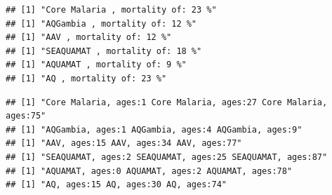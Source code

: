 \documentclass[]{article}
\newenvironment{Shaded}{\begin{snugshade}}{\end{snugshade}}
\newcommand{\KeywordTok}[1]{\textcolor[rgb]{0.13,0.29,0.53}{\textbf{#1}}}
\newcommand{\DataTypeTok}[1]{\textcolor[rgb]{0.13,0.29,0.53}{#1}}
\newcommand{\DecValTok}[1]{\textcolor[rgb]{0.00,0.00,0.81}{#1}}
\newcommand{\StringTok}[1]{\textcolor[rgb]{0.31,0.60,0.02}{#1}}
\newcommand{\ControlFlowTok}[1]{\textcolor[rgb]{0.13,0.29,0.53}{\textbf{#1}}}
\newcommand{\OperatorTok}[1]{\textcolor[rgb]{0.81,0.36,0.00}{\textbf{#1}}}
\newcommand{\NormalTok}[1]{#1}
\begin{document}
\begin{verbatim}
## [1] "Core Malaria , mortality of: 23 %"
## [1] "AQGambia , mortality of: 12 %"
## [1] "AAV , mortality of: 12 %"
## [1] "SEAQUAMAT , mortality of: 18 %"
## [1] "AQUAMAT , mortality of: 9 %"
## [1] "AQ , mortality of: 23 %"
\end{verbatim}

\begin{Shaded}
\end{Shaded}

\begin{verbatim}
## [1] "Core Malaria, ages:1 Core Malaria, ages:27 Core Malaria, ages:75"
## [1] "AQGambia, ages:1 AQGambia, ages:4 AQGambia, ages:9"
## [1] "AAV, ages:15 AAV, ages:34 AAV, ages:77"
## [1] "SEAQUAMAT, ages:2 SEAQUAMAT, ages:25 SEAQUAMAT, ages:87"
## [1] "AQUAMAT, ages:0 AQUAMAT, ages:2 AQUAMAT, ages:78"
## [1] "AQ, ages:15 AQ, ages:30 AQ, ages:74"
\end{verbatim}

\begin{Shaded}
\end{Shaded}
\end{document}
